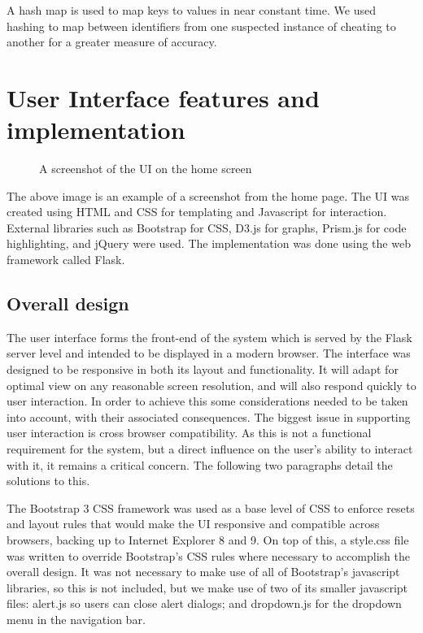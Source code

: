 \documentclass[11pt,a4paper]{article}
\begin{document}
A hash map is used to map keys to values in near constant time. We used hashing to map between identifiers from one suspected instance of cheating to another for a greater measure of accuracy.


\section{User Interface features and implementation}

\begin{figure}[H]
  \caption{A screenshot of the UI on the home screen}
  \label{fig:uiscreenshot}
\end{figure}

The above image is an example of a screenshot from the home page. The UI was created using HTML and CSS for templating and Javascript for interaction. External libraries such as Bootstrap for CSS, D3.js for graphs, Prism.js for code highlighting, and jQuery were used. The implementation was done using the web framework called Flask.

\subsection{Overall design}

The user interface forms the front-end of the system which is served by the Flask server level and intended to be displayed in a modern browser. The interface was designed to be responsive in both its layout and functionality. It will adapt for optimal view on any reasonable screen resolution, and will also respond quickly to user interaction.  In order to achieve this some considerations needed to be taken into account, with their associated consequences. The biggest issue in supporting user interaction is cross browser compatibility. As this is not a functional requirement for the system, but a direct influence on the user’s ability to interact with it, it remains a critical concern. The following two paragraphs detail the solutions to this. 

The Bootstrap 3 CSS framework was used as a base level of CSS to enforce resets and layout rules that would make the UI responsive and compatible across browsers, backing up to Internet Explorer 8 and 9. On top of this, a style.css file was written to override Bootstrap’s CSS rules where necessary to accomplish the overall design. It was not necessary to make use of all of Bootstrap’s javascript libraries, so this is not included, but we make use of two of its smaller javascript files: alert.js so users can close alert dialogs; and dropdown.js for the dropdown menu in the navigation bar.
\end{document}
